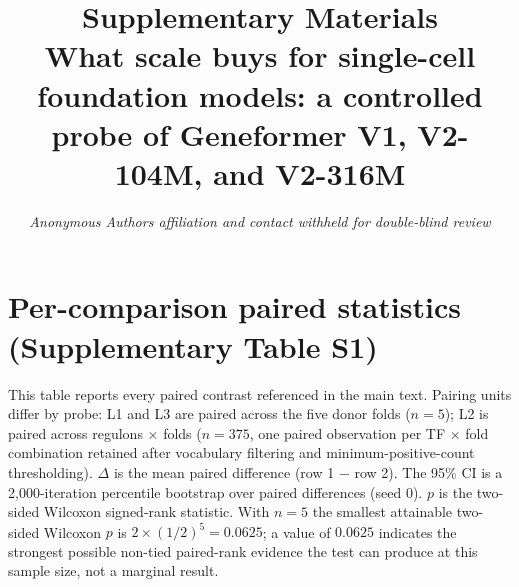 \documentclass[11pt]{article}
\title{\textbf{Supplementary Materials} \\[6pt]
{\large What scale buys for single-cell foundation models: a controlled probe of Geneformer V1, V2-104M, and V2-316M}}
\author{\textit{Anonymous Authors \textemdash{} affiliation and contact withheld for double-blind review}}
\date{}
\begin{document}
\maketitle

\section{Per-comparison paired statistics (Supplementary Table S1)}

This table reports every paired contrast referenced in the main text. Pairing units differ by probe: L1 and L3 are paired across the five donor folds (\(n=5\)); L2 is paired across regulons \(\times\) folds (\(n=375\), one paired observation per TF \(\times\) fold combination retained after vocabulary filtering and minimum-positive-count thresholding). \(\Delta\) is the mean paired difference (row 1 \(-\) row 2). The 95\% CI is a 2{,}000-iteration percentile bootstrap over paired differences (seed 0). \(p\) is the two-sided Wilcoxon signed-rank statistic. With \(n=5\) the smallest attainable two-sided Wilcoxon \(p\) is \(2 \times (1/2)^5 = 0.0625\); a value of \(0.0625\) indicates the strongest possible non-tied paired-rank evidence the test can produce at this sample size, not a marginal result.
\end{document}
